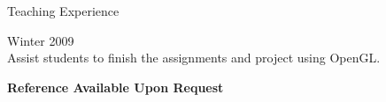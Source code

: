 \documentclass[10pt]{article}
\newenvironment{mydescription}{%
    \begin{description}
        \setlength{\itemsep}{0.25em}%
        \setlength{\parsep}{0em}%
        \setlength{\topsep}{\itemsep}%
        \setlength{\parskip}{0em}%
        \setlength{\labelwidth}{0.1em}
        \setlength{\labelsep}{0em} 
    }%
{\end{description}}
\begin{document}
\begin{cv}
\begin{cvlist}{Teaching Experience}
\begin{mydescription}
        \item[Teaching assistant, \emph{Advanced Computer Graphics}, Concordia University] \hfill Winter 2009 \\
            Assist students to finish the assignments and project using OpenGL. 
    \end{mydescription}
\end{cvlist}

\begin{center}
    \textbf{Reference Available Upon Request}
\end{center}

\end{cv} 
\end{document}
